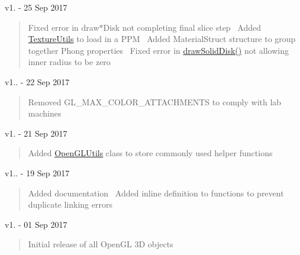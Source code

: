 v1. -\/ 25 Sep 2017 \begin{quote}
Fixed error in draw$\ast$\+Disk not completing final slice step~\newline
Added \hyperlink{namespace_texture_utils}{Texture\+Utils} to load in a P\+PM~\newline
Added Material\+Struct structure to group together Phong properties~\newline
Fixed error in \hyperlink{namespace_c_s_c_i441_a9bc98669fe2b67ecb45d7b18c61f74d9}{draw\+Solid\+Disk()} not allowing inner radius to be zero \end{quote}


v1.. -\/ 22 Sep 2017 \begin{quote}
Removed G\+L\+\_\+\+M\+A\+X\+\_\+\+C\+O\+L\+O\+R\+\_\+\+A\+T\+T\+A\+C\+H\+M\+E\+N\+TS to comply with lab machines \end{quote}


v1. -\/ 21 Sep 2017 \begin{quote}
Added \hyperlink{namespace_open_g_l_utils}{Open\+G\+L\+Utils} class to store commonly used helper functions \end{quote}


v1.. -\/ 19 Sep 2017 \begin{quote}
Added documentation~\newline
Added inline definition to functions to prevent duplicate linking errors \end{quote}


v1. -\/ 01 Sep 2017 \begin{quote}
Initial release of all Open\+GL 3D objects\end{quote}
